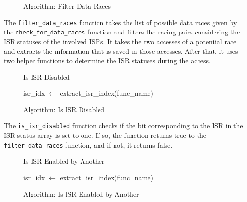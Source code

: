 \documentclass[
fancyheadings, %
%
%
]{stsreprt}
\begin{document}
{\begin{figure}[H]
\begin{algorithm}[H]
				\;
			\end{algorithm}
			\caption{Algorithm: Filter Data Races}
		\end{figure}
		\vspace{1cm}
		
		The \texttt{filter\_data\_races} function takes the list of possible data races given by the \texttt{check\_for\_data\_races} function and filters the racing pairs considering the \ac{ISR} statuses of the involved \acp{ISR}. It takes the two accesses of a potential race and extracts the information that is saved in those accesses. After that, it uses two helper functions to determine the \ac{ISR} statuses during the access.
		
		
		\begin{figure}[H]
			\centering
			\begin{algorithm}[H]
				\caption{Is ISR Disabled}
				\DontPrintSemicolon
				\SetAlgoLined
				\BlankLine
				
				isr\_idx $\gets$ extract\_isr\_index(func\_name)\;
				\;
			\end{algorithm}
			\caption{Algorithm: Is \ac{ISR} Disabled}
		\end{figure}
		\vspace{1cm}
		
		The \texttt{is\_isr\_disabled} function checks if the bit corresponding to the \ac{ISR} in the \Ac{ISR} status array is set to one. If so, the function returns true to the \texttt{filter\_data\_races} function, and if not, it returns false. 
		
		\begin{figure}[H]
			\centering
			\begin{algorithm}[H]
				\caption{Is ISR Enabled by Another}
				\DontPrintSemicolon
				\SetAlgoLined
				\BlankLine
				
				isr\_idx $\gets$ extract\_isr\_index(func\_name)\;
				\;
			\end{algorithm}
			\caption{Algorithm: Is \ac{ISR} Enabled by Another}
		\end{figure}
		\vspace{1cm}
		
}
\end{document}

